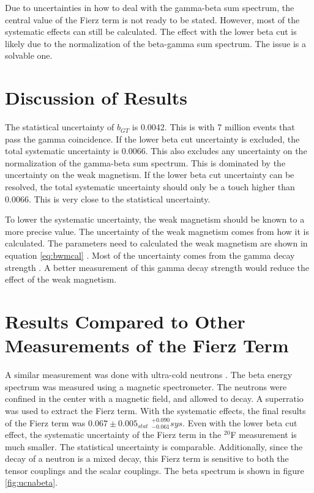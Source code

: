 \documentclass[../MaxHughesThesis.tex]{subfiles}
\begin{document}
Due to uncertainties in how to deal with the gamma-beta sum spectrum, the central value of the Fierz term is not ready to be stated. 
However, most of the systematic effects can still be calculated.
The effect with the lower beta cut is likely due to the normalization of the beta-gamma sum spectrum.
The issue is a solvable one. 

\section{Discussion of Results}

The statistical uncertainty of $b_{GT}$ is 0.0042.
This is with 7 million events that pass the gamma coincidence.
If the lower beta cut uncertainty is excluded, the total systematic uncertainty is 0.0066.
This also excludes any uncertainty on the normalization of the gamma-beta sum spectrum.
This is dominated by the uncertainty on the weak magnetism.
If the lower beta cut uncertainty can be resolved, the total systematic uncertainty should only be a touch higher than 0.0066.
This is very close to the statistical uncertainty. 

To lower the systematic uncertainty, the weak magnetism should be known to a more precise value.
The uncertainty of the weak magnetism comes from how it is calculated.
The parameters need to calculated the weak magnetism are shown in equation \ref{eq:bwmcal} .
Most of the uncertainty comes from the gamma decay strength \cite{Min11}.
A better measurement of this gamma decay strength would reduce the effect of the weak magnetism.

\section{Results Compared to Other Measurements of the Fierz Term}

A similar measurement was done with ultra-cold neutrons \cite{Hic17}.
The beta energy spectrum was measured using a magnetic spectrometer.
The neutrons were confined in the center with a magnetic field, and allowed to decay.
A superratio was used to extract the Fierz term.
With the systematic effects, the final results of the Fierz term was $0.067 \pm 0.005_{stat}$ $ ^{+0.090}_{-0.061} sys$.
Even with the lower beta cut effect, the systematic uncertainty of the Fierz term in the $^{20}$F measurement is much smaller.
The statistical uncertainty is comparable. 
Additionally, since the decay of a neutron is a mixed decay, this Fierz term is sensitive to both the tensor couplings and the scalar couplings.  
The beta spectrum is shown in figure \ref{fig:ucnabeta}.
\end{document}
